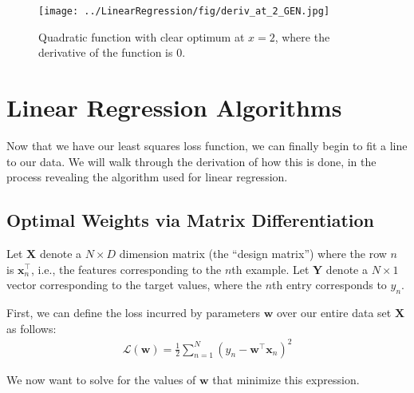 \begin{figure}
    \centering
    \texttt{[image: ../LinearRegression/fig/deriv\_at\_2\_GEN.jpg]}
    \caption{Quadratic function with clear optimum at $x=2$, where the derivative of the function is 0.}
    \label{fig:quad-deriv-at-2}
\end{figure}

\section{Linear Regression Algorithms}
Now that we have our least squares loss function, we can finally begin to fit a line to our data. We will walk through the derivation of how this is done, in the process revealing the algorithm used for linear regression.

\subsection{Optimal Weights via Matrix Differentiation}

Let $\textbf{X}$ denote a $N \times D$ dimension matrix (the ``design matrix'') where the row $n$ is $\textbf{x}_n^\top$, i.e., the features corresponding to the $n$th example. Let $\textbf{Y}$ denote a $N\times 1$ vector corresponding to the target values, where the $n$th entry corresponds to $y_n$.

First, we can define the loss incurred by parameters $\textbf{w}$ over our entire data set $\textbf{X}$ as follows:
\begin{align}
    \mathcal{L}(\textbf{w}) = \frac{1}{2} \sum_{n=1}^{N} (y_{n} - \textbf{w}^\top\textbf{x}_{n})^2
\end{align}


We now want to solve for the values of $\textbf{w}$ that minimize this expression.

